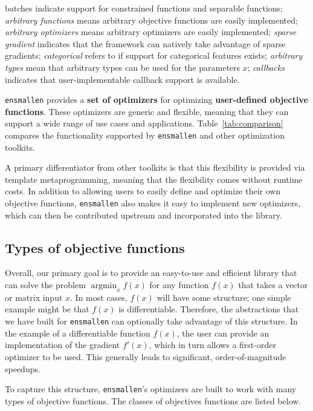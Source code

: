 \begin{table}[t!]
{{batches} indicate support for constrained functions and separable functions;
{\it arbitrary functions} means arbitrary objective functions are easily
implemented; {\it arbitrary optimizers} means arbitrary optimizers are easily
implemented; {\it sparse gradient} indicates that the framework can natively
take advantage of sparse gradients; {\it categorical} refers to if support
for categorical features exists; {\it arbitrary types} mean that arbitrary types
can be used for the parameters $x$;
{\it callbacks} indicates that user-implementable callback support is available.
}
\label{tab:comparison}
\end{table}

{\tt ensmallen} provides a {\bf set of optimizers} for optimizing {\bf
user-defined objective functions}.  These optimizers are generic and flexible,
meaning that they can support a wide range of use cases and applications.
Table~\ref{tab:comparison} compares the functionality
supported by {\tt ensmallen} and other optimization toolkits.

A primary differentiator from other toolkits is that this flexibility is provided
via template metaprogramming, meaning that the flexibility comes without runtime costs.
In addition to allowing users to easily define and optimize their own objective
functions, {\tt ensmallen} also makes it easy to implement new optimizers, which
can then be contributed upstream and incorporated into the library.


\subsection{Types of objective functions}

Overall, our primary goal is to provide an easy-to-use and efficient library
that can solve the problem $\operatorname{argmin}_x f(x)$ for any function
$f(x)$ that takes a vector or matrix input $x$.  In most cases, $f(x)$ will have
some structure; one simple example might be that $f(x)$ is differentiable.
Therefore, the abstractions that we have built for {\tt ensmallen} can
optionally take advantage of this structure.  In the example of a differentiable
function $f(x)$, the user can provide an implementation of the gradient $f'(x)$,
which in turn allows a first-order optimizer to be used.  This generally leads
to significant, order-of-magnitude speedups.

To capture this structure, {\tt ensmallen}'s optimizers are built to work with
many types of objective functions.  The classes of objectives functions
are listed below.

